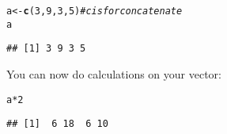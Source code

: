 \documentclass[12pt,a4paper]{scrartcl}\usepackage[]{graphicx}\usepackage[]{color}
\makeatletter
\newcommand{\hlnum}[1]{\textcolor[rgb]{0.686,0.059,0.569}{#1}}%
\newcommand{\hlcom}[1]{\textcolor[rgb]{0.678,0.584,0.686}{\textit{#1}}}%
\newcommand{\hlopt}[1]{\textcolor[rgb]{0,0,0}{#1}}%
\newcommand{\hlstd}[1]{\textcolor[rgb]{0.345,0.345,0.345}{#1}}%
\newcommand{\hlkwb}[1]{\textcolor[rgb]{0.69,0.353,0.396}{#1}}%
\newcommand{\hlkwd}[1]{\textcolor[rgb]{0.737,0.353,0.396}{\textbf{#1}}}%
\newenvironment{kframe}{%
 \def\at@end@of@kframe{}%
 \ifinner\ifhmode%
  \def\at@end@of@kframe{\end{minipage}}%
  \begin{minipage}{\columnwidth}%
 \fi\fi%
 \def\FrameCommand##1{\hskip\@totalleftmargin \hskip-\fboxsep
 \colorbox{shadecolor}{##1}\hskip-\fboxsep
     \hskip-\linewidth \hskip-\@totalleftmargin \hskip\columnwidth}%
 \MakeFramed {\advance\hsize-\width
   \@totalleftmargin\z@ \linewidth\hsize
   \@setminipage}}%
 {\par\unskip\endMakeFramed%
 \at@end@of@kframe}
\newenvironment{knitrout}{}{} %
\makeatother
\begin{document}
\begin{knitrout}
\color{fgcolor}\begin{kframe}
\begin{alltt}
\hlstd{a} \hlkwb{<-} \hlkwd{c}\hlstd{(}\hlnum{3}\hlstd{,}\hlnum{9}\hlstd{,}\hlnum{3}\hlstd{,}\hlnum{5}\hlstd{)} \hlcom{# c is for concatenate}
\hlstd{a}
\end{alltt}
\begin{verbatim}
## [1] 3 9 3 5
\end{verbatim}
\end{kframe}
\end{knitrout}

You can now do calculations on your vector:

\begin{knitrout}
\color{fgcolor}\begin{kframe}
\begin{alltt}
\hlstd{a} \hlopt{*} \hlnum{2}
\end{alltt}
\begin{verbatim}
## [1]  6 18  6 10
\end{verbatim}
\end{kframe}
\end{knitrout}
\end{document}
